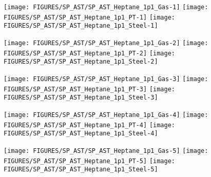 \begin{figure}[p]
\begin{center}
\texttt{[image: FIGURES/SP\_AST/SP\_AST\_Heptane\_1p1\_Gas-1]}
\texttt{[image: FIGURES/SP\_AST/SP\_AST\_Heptane\_1p1\_PT-1]}
\texttt{[image: FIGURES/SP\_AST/SP\_AST\_Heptane\_1p1\_Steel-1]}
\end{center}
\label{SP_Heptane_1p1_1m}
\end{figure}

\begin{figure}[p]
\begin{center}
\texttt{[image: FIGURES/SP\_AST/SP\_AST\_Heptane\_1p1\_Gas-2]}
\texttt{[image: FIGURES/SP\_AST/SP\_AST\_Heptane\_1p1\_PT-2]}
\texttt{[image: FIGURES/SP\_AST/SP\_AST\_Heptane\_1p1\_Steel-2]}
\end{center}
\label{SP_Heptane_1p1_2m}
\end{figure}

\begin{figure}[p]
\begin{center}
\texttt{[image: FIGURES/SP\_AST/SP\_AST\_Heptane\_1p1\_Gas-3]}
\texttt{[image: FIGURES/SP\_AST/SP\_AST\_Heptane\_1p1\_PT-3]}
\texttt{[image: FIGURES/SP\_AST/SP\_AST\_Heptane\_1p1\_Steel-3]}
\end{center}
\label{SP_Heptane_1p1_3m}
\end{figure}

\begin{figure}[p]
\begin{center}
\texttt{[image: FIGURES/SP\_AST/SP\_AST\_Heptane\_1p1\_Gas-4]}
\texttt{[image: FIGURES/SP\_AST/SP\_AST\_Heptane\_1p1\_PT-4]}
\texttt{[image: FIGURES/SP\_AST/SP\_AST\_Heptane\_1p1\_Steel-4]}
\end{center}
\label{SP_Heptane_1p1_4m}
\end{figure}

\begin{figure}[p]
\begin{center}
\texttt{[image: FIGURES/SP\_AST/SP\_AST\_Heptane\_1p1\_Gas-5]}
\texttt{[image: FIGURES/SP\_AST/SP\_AST\_Heptane\_1p1\_PT-5]}
\texttt{[image: FIGURES/SP\_AST/SP\_AST\_Heptane\_1p1\_Steel-5]}
\end{center}
\label{SP_Heptane_1p1_5m}
\end{figure}



\clearpage

